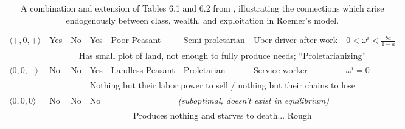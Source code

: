 \begin{table}[ht!]
{\begin{tabularx}{\textwidth}{|p{1.6cm}||p{1.4cm}XXp{1.8cm}XXp{2.2cm}|}
$\langle +, 0, + \rangle$ & Yes & No & Yes & Poor Peasant & Semi-proletarian & Uber driver after work & $0 < \omega^i < \frac{ba}{1-a}$ \\
 & \multicolumn{7}{c|}{Has small plot of land, not enough to fully produce needs; ``Proletarianizing''} \\ \hline
$\langle 0, 0, + \rangle$ & No & No & Yes & Landless Peasant & Proletarian & Service worker & $\omega^i = 0$ \\
 & \multicolumn{7}{c|}{Nothing but their labor power to sell / nothing but their chains to lose} \\ \hline
$\langle 0, 0, 0 \rangle$ & No & No & No & \multicolumn{4}{c|}{\textit{(suboptimal, doesn't exist in equilibrium)}} \\
 & \multicolumn{7}{c|}{Produces nothing and starves to death... Rough} \\\hline
\end{tabularx}
}
\caption{A combination and extension of Tables 6.1 and 6.2 from \cite{roemer_free_to_lose}, illustrating the connections which arise endogenously between class, wealth, and exploitation in Roemer's model.}
\end{table}
